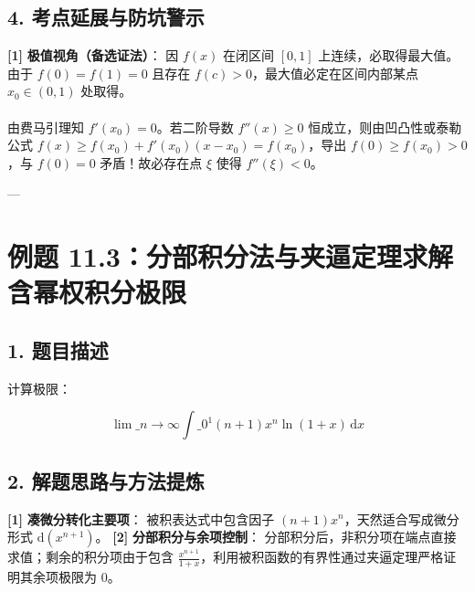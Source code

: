 \documentclass[11pt,a4paper,UTF8]{ctexart}
\begin{document}
\subsection{4. 考点延展与防坑警示}
\begin{solbox}[分步推导与答题规范]
\textbf{[1]}  \textbf{极值视角（备选证法）}：
因 $f(x)$ 在闭区间 $[0, 1]$ 上连续，必取得最大值。由于 $f(0)=f(1)=0$ 且存在 $f(c)>0$，最大值必定在区间内部某点 $x_0 \in (0, 1)$ 处取得。\\ \\
由费马引理知 $f'(x_0) = 0$。若二阶导数 $f''(x) \ge 0$ 恒成立，则由凹凸性或泰勒公式 $f(x) \ge f(x_0) + f'(x_0)(x-x_0) = f(x_0)$，导出 $f(0) \ge f(x_0) > 0$，与 $f(0)=0$ 矛盾！故必存在点 $\xi$ 使得 $f''(\xi) < 0$。
\end{solbox}

---


\section{例题 11.3：分部积分法与夹逼定理求解含幂权积分极限}


\subsection{1. 题目描述}
计算极限：

\begin{equation*}
\lim\_{n \to \infty} \int\_0^1 (n+1) x^n \ln(1+x)\,\mathrm{d}x
\end{equation*}



\subsection{2. 解题思路与方法提炼}
\begin{solbox}[分步推导与答题规范]
\textbf{[1]}  \textbf{凑微分转化主要项}：
被积表达式中包含因子 $(n+1)x^n$，天然适合写成微分形式 $\mathrm{d}(x^{n+1})$。
\textbf{[2]}  \textbf{分部积分与余项控制}：
分部积分后，非积分项在端点直接求值；剩余的积分项由于包含 $\frac{x^{n+1}}{1+x}$，利用被积函数的有界性通过夹逼定理严格证明其余项极限为 $0$。
\end{solbox}
\end{document}
